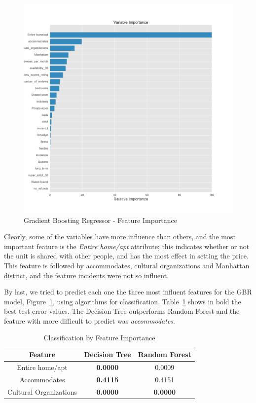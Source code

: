 \documentclass[sigconf]{acmart}
\begin{document}
\begin{figure}[!htpb]
	\centering
	\includegraphics[width=0.9\linewidth]{images/feature_importance_gridSearchCV_price}
	\caption{Gradient Boosting Regressor - Feature Importance}
	\label{fig:featureimportanc_gridSearchCVprice}
\end{figure}

Clearly, some of the variables have more influence than others, and the most important feature is the \textit{Entire home/apt} attribute; this indicates whether or not the unit is shared with other people, and has the most effect in setting the price. This feature is followed by accommodates, cultural organizations and Manhattan district, and the feature incidents were not so influent.

By last, we tried to predict each one the three most influent features for the GBR model, Figure~\ref{fig:featureimportanc_gridSearchCVprice}, using algorithms for classification. Table~\ref{tab:classification} shows in bold the best test error values. The Decision Tree outperforms Random Forest and the feature with more difficult to predict was \textit{accommodates}.

\begin{table}[!htpb]
	\fontsize{7pt}{7pt}\selectfont
	\centering
	\caption{Classification by Feature Importance}
	\label{tab:classification}
	\begin{tabular}{ccc}
		\toprule
		   \textbf{Feature}    & \textbf{Decision Tree} & \textbf{Random Forest} \\ \midrule
		   Entire home/apt     &    \textbf{0.0000}     &         0.0009         \\ \midrule
		     Accommodates      &    \textbf{0.4115}     &         0.4151         \\ \midrule
		Cultural Organizations &    \textbf{0.0000}     &    \textbf{0.0000}     \\ \bottomrule
	\end{tabular}
\end{table}
\end{document}

